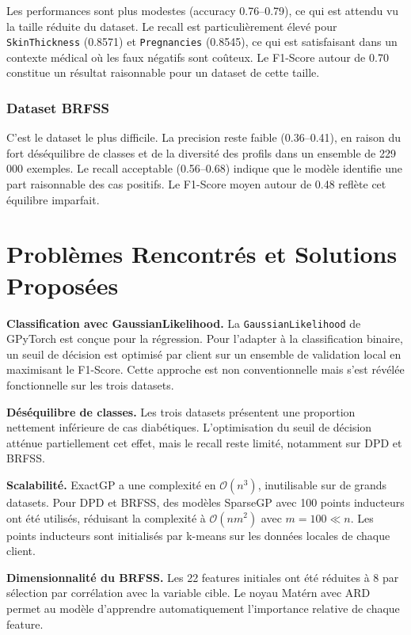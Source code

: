 \documentclass[12pt,a4paper]{article}
\begin{document}
Les performances sont plus modestes (accuracy 0.76–0.79), ce qui est attendu vu la taille réduite du dataset. Le recall est particulièrement élevé pour \texttt{SkinThickness} (0.8571) et \texttt{Pregnancies} (0.8545), ce qui est satisfaisant dans un contexte médical où les faux négatifs sont coûteux. Le F1-Score autour de 0.70 constitue un résultat raisonnable pour un dataset de cette taille.

\subsubsection*{Dataset BRFSS}

C'est le dataset le plus difficile. La precision reste faible (0.36–0.41), en raison du fort déséquilibre de classes et de la diversité des profils dans un ensemble de 229\,000 exemples. Le recall acceptable (0.56–0.68) indique que le modèle identifie une part raisonnable des cas positifs. Le F1-Score moyen autour de 0.48 reflète cet équilibre imparfait.


\section{Problèmes Rencontrés et Solutions Proposées}

\textbf{Classification avec GaussianLikelihood.} La \texttt{GaussianLikelihood} de GPyTorch est conçue pour la régression. Pour l'adapter à la classification binaire, un seuil de décision est optimisé par client sur un ensemble de validation local en maximisant le F1-Score. Cette approche est non conventionnelle mais s'est révélée fonctionnelle sur les trois datasets.

\textbf{Déséquilibre de classes.} Les trois datasets présentent une proportion nettement inférieure de cas diabétiques. L'optimisation du seuil de décision atténue partiellement cet effet, mais le recall reste limité, notamment sur DPD et BRFSS.

\textbf{Scalabilité.} ExactGP a une complexité en $\mathcal{O}(n^3)$, inutilisable sur de grands datasets. Pour DPD et BRFSS, des modèles SparseGP avec 100 points inducteurs ont été utilisés, réduisant la complexité à $\mathcal{O}(nm^2)$ avec $m = 100 \ll n$. Les points inducteurs sont initialisés par k-means sur les données locales de chaque client.

\textbf{Dimensionnalité du BRFSS.} Les 22 features initiales ont été réduites à 8 par sélection par corrélation avec la variable cible. Le noyau Matérn avec ARD permet au modèle d'apprendre automatiquement l'importance relative de chaque feature.
\end{document}
